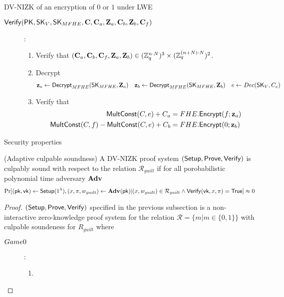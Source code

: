 \begin{subsection}{DV-NIZK of an encryption of $0$ or $1$ under LWE}
\begin{description}
    \item[${\mathsf{Verify}}(\mathsf{PK}, \mathsf{SK}_{V}, \mathsf{SK}_{MFHE}, \mathbf{C}, \mathbf{C}_a, \mathbf{Z}_a, \mathbf{C}_b, \mathbf{Z}_b, \mathbf{C}_f)$]:
      \begin{enumerate}
      \item Verify that $(\mathbf{C}_a, \mathbf{C}_b, \mathbf{C}_f, \mathbf{Z}_a, \mathbf{Z}_b) \in (\mathbb{Z}_q^{n \cdot N})^3 \times (\mathbb{Z}_q^{(n+N)\cdot N})^2$.
      \item Decrypt
        \begin{align*}
          \mathbf{z}_a &\gets {\mathsf{Decrypt}}_{MFHE}(\mathsf{SK}_{MFHE}, \mathbf{Z}_a) & \mathbf{z}_b &\gets {\mathsf{Decrypt}}_{MFHE}(\mathsf{SK}_{MFHE}, \mathbf{Z}_b) & e &\gets Dec(\mathsf{SK}_{V}, C_e)
        \end{align*}
        
      \item Verify that
        \begin{align*}
          {\mathsf{MultConst}}(C, e)+C_a &= FHE.{\mathsf{Encrypt}}(f; \mathbf{z}_a) \\
          {\mathsf{MultConst}}(C, f) - {\mathsf{MultConst}}(C, e) + C_b &= FHE.{\mathsf{Encrypt}}(0; \mathbf{z}_b)
        \end{align*}
      \end{enumerate}
    \end{description}
\end{subsection}



  \begin{subsection}{Security properties}

    \begin{definition}{(Adaptive culpable soundness) }
      A DV-NIZK proof system $({\mathsf{Setup}}, {\mathsf{Prove}}, {\mathsf{Verify}})$ is culpably sound with respect to the relation $\mathcal{R}_{guilt}$ if for all porobabilistic polynomial time adversary $\mathbf{Adv}$
      \begin{align*}
        \Pr[(\mathsf{pk}, \mathsf{vk}) \gets {\mathsf{Setup}}(1^{\lambda}), (x, \pi, w_{guilt}) \gets \mathbf{Adv}(\mathsf{pk}) | (x, w_{guilt}) \in \mathcal{R}_{guilt} \wedge {\mathsf{Verify}}(\mathsf{vk}, x, \pi) = \mathsf{True}] \approx 0
      \end{align*}
    \end{definition}
    
    \begin{proof}
      $({\mathsf{Setup}}, {\mathsf{Prove}}, {\mathsf{Verify}})$ specified in the previous subsection is a non-interactive zero-knowledge proof system for the relation $\mathcal{R} = \{ m | m \in \{0,1\}\}$ with culpable soundeness for $R_{guilt}$ where
      \begin{lemma}
    	\begin{description}
    	\item[$\boldmath{Game 0}$] :
    	  \begin{enumerate}
    	  \item 
    	  \end{enumerate}
    	\end{description}
      \end{lemma}
    \end{proof}
  \end{subsection}
